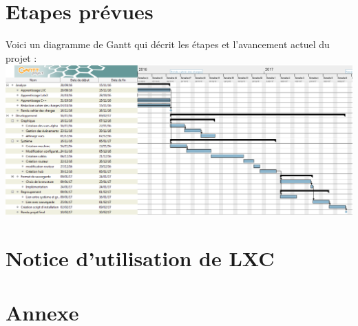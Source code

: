 \documentclass[a4paper]{article}
\begin{document}
\section{Etapes pr\'evues}
Voici un diagramme de Gantt qui décrit les étapes et l'avancement actuel du projet :\\
\includegraphics[scale=0.35]{gantt3.png}

\section{Notice d'utilisation de LXC}


\newpage
\section{Annexe}


\end{document}
